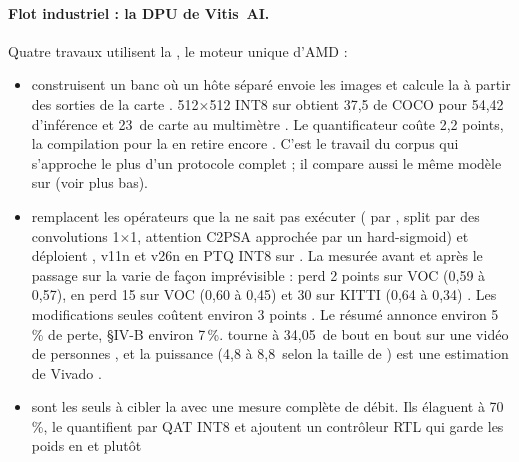 \paragraph{Flot industriel : la DPU de Vitis~AI.} Quatre travaux utilisent la , le
moteur unique d'AMD :
\begin{itemize}
  \item \citet{arxiv-2304.11580-framework-benchmarking-real-time-embedded} construisent un
    banc où un hôte séparé envoie les images et calcule la  à partir des sorties de la
    carte .  512$\times$512 INT8 sur  obtient 37,5 de  COCO
    pour 54,42\, d'inférence et 23\, de carte au multimètre . Le
    quantificateur coûte 2,2 points, la compilation pour la  en retire encore
    . C'est le travail du corpus qui s'approche le plus d'un protocole complet ;
    il compare aussi le même modèle sur  (voir plus bas).
  \item \citet{arxiv-2607.13106-no-attention-no-problem-dpu}\pp{} remplacent les opérateurs
    que la  ne sait pas exécuter ( par , split par des convolutions 1$\times$1,
    attention C2PSA approchée par un hard-sigmoid) et déploient , v11n et v26n en
    PTQ INT8 sur  . La  mesurée avant et après le passage
    sur la  varie de façon imprévisible :  perd 2 points sur VOC (0,59 à 0,57),
     en perd 15 sur VOC (0,60 à 0,45) et 30 sur KITTI (0,64 à 0,34)
    . Les modifications seules coûtent environ 3 points . Le résumé annonce environ 5\,\% de perte, §IV-B environ 7\,\%. 
    tourne à 34,05\, de bout en bout sur une vidéo de personnes , et la
    puissance (4,8 à 8,8\, selon la taille de ) est une estimation de Vivado
    .
  \item \citet{2026-fata-low-cost-fpga-enhanced-cnn} sont les seuls à cibler la 
    avec une mesure complète de débit. Ils élaguent  à 70\,\%, le quantifient
    par QAT INT8 et ajoutent un contrôleur RTL qui garde les poids en  et  plutôt

\end{itemize}
